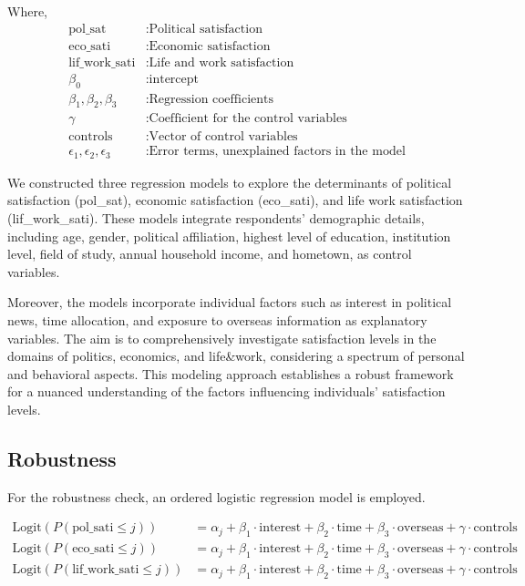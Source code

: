 \documentclass{article}
\begin{document}
\vspace{\baselineskip}
Where,
\begin{align*}
\text{pol\_sat} & : \text{Political satisfaction} \\
\text{eco\_sati} & : \text{Economic satisfaction} \\
\text{lif\_work\_sati} & : \text{Life and work satisfaction} \\
\beta_0 & :\text{intercept} \\
\beta_1, \beta_2, \beta_3 & : \text{Regression coefficients} \\
\gamma & : \text{Coefficient for the control variables} \\
\text{controls} & : \text{Vector of control variables} \\
\epsilon_1, \epsilon_2, \epsilon_3 & : \text{Error terms, unexplained factors in the model}
\end{align*}

We constructed three regression models to explore the determinants of political satisfaction (pol\_sat), economic satisfaction (eco\_sati), and life work satisfaction (lif\_work\_sati). These models integrate respondents' demographic details, including age, gender, political affiliation, highest level of education, institution level, field of study, annual household income, and hometown, as control variables.

Moreover, the models incorporate individual factors such as interest in political news, time allocation, and exposure to overseas information as explanatory variables. The aim is to comprehensively investigate satisfaction levels in the domains of politics, economics, and life\&work, considering a spectrum of personal and behavioral aspects. This modeling approach establishes a robust framework for a nuanced understanding of the factors influencing individuals' satisfaction levels.
\vspace{\baselineskip}
\vspace{\baselineskip}
\vspace{\baselineskip}
\subsection{Robustness}
For the robustness check, an ordered logistic regression model is employed.

\begin{align}
\text{Logit}(P(\text{pol\_sati} \leq j)) &= \alpha_j + \beta_1 \cdot \text{interest} + \beta_2 \cdot \text{time} + \beta_3 \cdot \text{overseas} + \gamma \cdot \text{controls} \nonumber \\
\text{Logit}(P(\text{eco\_sati} \leq j)) &= \alpha_j + \beta_1 \cdot \text{interest} + \beta_2 \cdot \text{time} + \beta_3 \cdot \text{overseas} + \gamma \cdot \text{controls} \nonumber \\
\text{Logit}(P(\text{lif\_work\_sati} \leq j)) &= \alpha_j + \beta_1 \cdot \text{interest} + \beta_2 \cdot \text{time} + \beta_3 \cdot \text{overseas} + \gamma \cdot \text{controls} \nonumber
\end{align}
\end{document}
